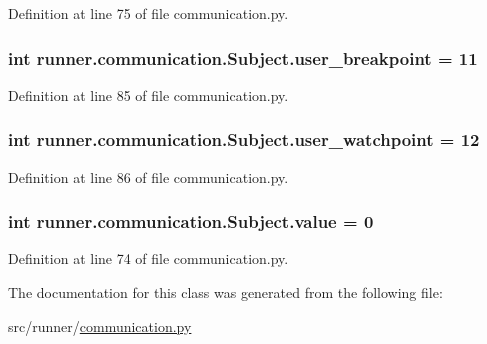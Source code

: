 Definition at line 75 of file communication.\+py.

\hypertarget{classrunner_1_1communication_1_1Subject_a01c9075135575b142e781b35f3a8fcae}{}
\subsubsection[{user\+\_\+breakpoint}]{\setlength{\rightskip}{0pt plus 5cm}int runner.\+communication.\+Subject.\+user\+\_\+breakpoint = 11\hspace{0.3cm}{\ttfamily [static]}}\label{classrunner_1_1communication_1_1Subject_a01c9075135575b142e781b35f3a8fcae}


Definition at line 85 of file communication.\+py.

\hypertarget{classrunner_1_1communication_1_1Subject_a2009ceb84c36cf4c170fbc71bd2a612f}{}
\subsubsection[{user\+\_\+watchpoint}]{\setlength{\rightskip}{0pt plus 5cm}int runner.\+communication.\+Subject.\+user\+\_\+watchpoint = 12\hspace{0.3cm}{\ttfamily [static]}}\label{classrunner_1_1communication_1_1Subject_a2009ceb84c36cf4c170fbc71bd2a612f}


Definition at line 86 of file communication.\+py.

\hypertarget{classrunner_1_1communication_1_1Subject_a5915ed27f467b67e5091ac360deca3f0}{}
\subsubsection[{value}]{\setlength{\rightskip}{0pt plus 5cm}int runner.\+communication.\+Subject.\+value = 0\hspace{0.3cm}{\ttfamily [static]}}\label{classrunner_1_1communication_1_1Subject_a5915ed27f467b67e5091ac360deca3f0}


Definition at line 74 of file communication.\+py.



The documentation for this class was generated from the following file\+:\begin{DoxyCompactItemize}
\item 
src/runner/\hyperlink{communication_8py}{communication.\+py}\end{DoxyCompactItemize}
